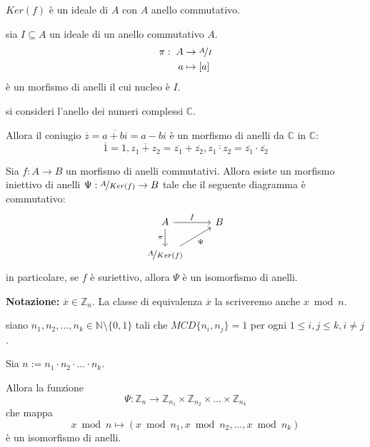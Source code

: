 \documentclass[../main.tex]{subfiles}
\begin{document}
\begin{remark}
    $Ker(f)$ è un ideale di $A$ con $A$ anello commutativo.
\end{remark}

\begin{example}
    sia $I \subseteq A$ un ideale di un anello commutativo $A$.
    \begin{align*}
        \pi: \; A & \rightarrow \nicefrac{A}{I} \\
        a         & \mapsto [a]
    \end{align*}
    è un morfismo di anelli il cui nucleo è $I$.
\end{example}

\begin{example}
    si consideri l'anello dei numeri complessi $\mathbb{C}$.

    Allora il coniugio $\overline{z} = \overline{a+bi} = a - bi$ è un morfismo di anelli da $\mathbb{C}$ in $\mathbb{C}$:
    \begin{equation*}
        \overline{1} = 1, \overline{z_1 + z_2} = \overline{z_1} + \overline{z_2}, \overline{z_1 \cdot z_2} = \overline{z_1} \cdot \overline{z_2}
    \end{equation*}
\end{example}

\begin{theorem}
    Sia $f : A \rightarrow B$ un morfismo di anelli commutativi. Allora esiste un morfismo iniettivo di anelli $\Psi : \nicefrac{A}{Ker(f)} \rightarrow B$ tale che il seguente diagramma è commutativo:
    \begin{equation*}
        \begin{tikzcd}
            A \arrow{r}{f} \arrow[swap]{d}{\pi} & B \\
            \nicefrac{A}{Ker(f)} \arrow[swap]{ur}{\Psi}
        \end{tikzcd}
    \end{equation*}
    in particolare, se $f$ è suriettivo, allora $\Psi$ è un isomorfismo di anelli.
\end{theorem}

\textbf{Notazione:} $\overline{x} \in \mathbb{Z}_n$. La classe di equivalenza $\overline{x}$ la scriveremo anche  $x \bmod n$.

\begin{theorem}
    siano $n_1,n_2,\ldots,n_k \in \mathbb{N} \setminus \{0,1\}$ tali che $MCD \{n_i,n_j\} = 1$ per ogni $1 \leq i,j \leq k, i \neq j$.

    Sia $n := n_1 \cdot n_2 \cdot \ldots \cdot n_k$.

    Allora la funzione
    \begin{equation*}
        \Psi : \mathbb{Z}_n \rightarrow \mathbb{Z}_{n_1} \times \mathbb{Z}_{n_2} \times \ldots \times \mathbb{Z}_{n_k}
    \end{equation*}
    che mappa
    \begin{equation*}
        x \bmod n \mapsto (x \bmod n_1, x \bmod n_2, \ldots, x \bmod n_k)
    \end{equation*}
    è un isomorfismo di anelli.
\end{theorem}
\end{document}
